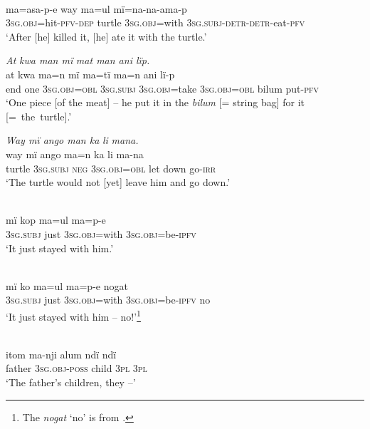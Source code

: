\ex {}\\
\gll ma=asa{{}-}p{{}-e} way  m{a=u}l      mï{=}na{{}-}na-ama-p\\
3\textsc{sg.obj}=hit-\textsc{pfv-dep}  turtle  3\textsc{sg.obj}=with  3\textsc{sg.subj}{}-\textsc{detr-detr}{}-eat-\textsc{pfv}\\
\glt ‘After [he] killed it, [he] ate it with the turtle.’

\ex \negmedspace \textit{A}{\textit{t}} \textit{kwa man m}{\textit{ï}} \textit{mat man ani lïp.}\\
\gll a{t} kwa  ma{=n} m{ï} ma{=}tï{} ma{=}n      ani lï-p\\
end  one    3\textsc{sg.obj=obl}  3\textsc{sg.subj}  3\textsc{sg.obj}=take  3\textsc{sg.obj=obl}  bilum put-\textsc{pfv}\\
\glt ‘{One} piece [of the meat]{ --} he put {it} in the \textit{bilum} [= string bag] for it \mbox{[= the turtle].’}

\ex \negmedspace \textit{Way mï ango man ka} {\textit{li}} \textit{mana.}\\
\gll way  mï      ango  ma{=}n{} ka  {li} ma{{}-}na\\
turtle  3\textsc{sg.subj}  \textsc{neg}  3\textsc{sg.obj}=\textsc{obl}  let  down  {go-}\textsc{irr}\\
\glt ‘The turtle would not [yet] {leave him and go down.}’

\ex {}\\
\gll mï      kop  m{a=u}l    ma{=}p{{}-}e\\
3\textsc{sg.subj}  just  \textsc{3sg.obj}=with  3\textsc{sg.obj}=be-\textsc{ipfv}\\
\glt ‘It just stayed with him.’

\ex {}\\
\gll mï      ko  m{a=u}l      ma{=}p{{}-}e      nogat\\
3\textsc{sg.subj}  just  3\textsc{sg.obj}=with  3\textsc{sg.obj}=be-\textsc{ipfv}  no\\
\glt ‘It just stayed with him -- no!’\footnote{The  \textit{nogat} ‘no’ is from .}

\ex {}\\
\gll itom  ma-nji      alum  ndï  {ndï}\\
father  3\textsc{sg.obj-poss}  child  3\textsc{pl}  \textsc{3pl}\\
\glt ‘The father’s children, {they –}’

